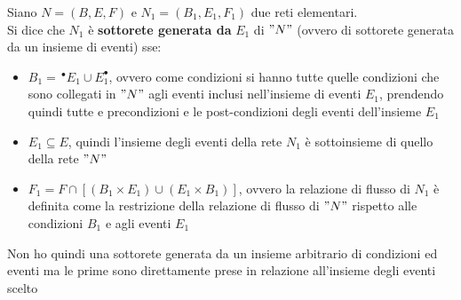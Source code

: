 \begin{definizione}
  Siano $N=(B, E, F)$ e $N_1=(B_1, E_1, F_1)$ due reti elementari.\\
  Si dice che $N_1$ è \textbf{sottorete generata da} $E_1$ di $"N"$ (ovvero di
  sottorete generata da un insieme di eventi) sse:
  \begin{itemize}
    \item $B_1=\,^\bullet E_1\cup E_1^\bullet$, ovvero come condizioni si
    hanno tutte quelle condizioni che sono collegati in $"N"$ agli eventi inclusi
    nell'insieme di eventi $E_1$, prendendo quindi tutte e precondizioni e le
    post-condizioni degli eventi dell'insieme $E_1$
    \item $E_1\subseteq E$, quindi l'insieme degli eventi della rete $N_1$
    è sottoinsieme di quello della rete $"N"$
    \item $F_1=F\cap[(B_1\times E_1)\cup (E_1\times B_1)]$, ovvero la relazione
    di flusso di $N_1$ è definita come la restrizione della relazione di flusso
    di $"N"$ rispetto alle condizioni $B_1$ e agli eventi $E_1$
  \end{itemize}
  Non ho quindi una sottorete generata da un insieme arbitrario di condizioni ed
  eventi ma le prime sono direttamente prese in relazione all'insieme degli
  eventi scelto
\end{definizione} \vspace{5mm} %
